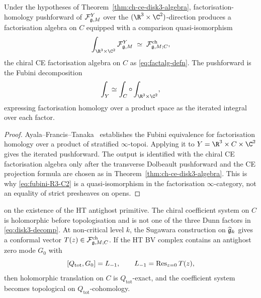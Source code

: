 \begin{theorem}
\label{thm:ch-ce-fubini-disk3-to-disk1}
%
Under the hypotheses of Theorem~\ref{thm:ch-ce-disk3-algebra},
factorisation-homology pushforward of $\mathcal{F}^Y_{\mathfrak{g},M}$ over the
$(\R^3\times\C^2)$-direction produces a factorisation algebra on $C$
equipped with a comparison quasi-isomorphism
\begin{equation}
\label{eq:fubini-R3-C2}
\int_{\R^3\times\C^2}\cF^Y_{\fg,M}
\;\simeq\;
\cF^{\mathrm{ch}}_{\fg,M;C},
\end{equation}
the chiral CE factorisation algebra on $C$ as
\eqref{eq:factalg-defn}. The pushforward is the Fubini decomposition
\begin{equation}
\int_Y \simeq \int_C \circ \int_{\R^3\times\C^2},
\end{equation}
expressing factorisation homology over a product space as the iterated
integral over each factor.
\end{theorem}

\begin{proof}
Ayala--Francis--Tanaka~\cite[Thm.\,4.1.3]{AyalaFrancisTanaka2017}
establishes the Fubini equivalence for factorisation homology over a
product of stratified $\infty$-topoi. Applying it to
$Y=\R^3\times C\times\C^2$ gives the iterated pushforward. The output is
identified with the chiral CE factorisation algebra only after the
transverse Dolbeault pushforward and the CE projection formula are
chosen as in Theorem~\ref{thm:ch-ce-disk3-algebra}. This is why
\eqref{eq:fubini-R3-C2} is a quasi-isomorphism in the factorisation
$\infty$-category, not an equality of strict presheaves on opens.
\end{proof}

\begin{theorem}
\label{thm:ch-ce-topologization-E3-top}
%
\ClaimStatusConditional{} on the existence of the HT antighost
primitive.
The chiral coefficient system on $C$ is holomorphic before
topologisation and is not one of the three Dunn factors in
\eqref{eq:disk3-decomp}. At non-critical level $k$, the Sugawara
construction on $\widehat{\mathfrak{g}}_k$ gives a conformal vector
$T(z)\in\mathcal{F}^{\mathrm{ch}}_{\mathfrak{g},M;C}$. If the HT BV complex contains an
antighost zero mode $G_0$ with
\[
[Q_{\mathrm{tot}},G_0]=L_{-1},\qquad L_{-1}=\operatorname{Res}_{z=0}T(z),
\]
then holomorphic translation on $C$ is $Q_{\mathrm{tot}}$-exact, and
the coefficient system becomes topological on
$Q_{\mathrm{tot}}$-cohomology.
\end{theorem}


